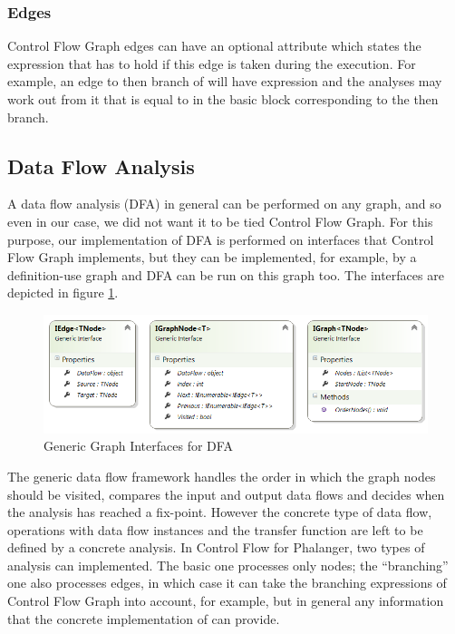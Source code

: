         \subsubsection*{Edges}
        Control Flow Graph edges can have an optional attribute which 
        states the expression that has to hold if this edge is taken 
        during the execution. For example, an edge to then branch of 
         will have expression  and the 
        analyses may work out from it that  is equal to 
         in the basic block corresponding to the then branch.
        
    \subsection{Data Flow Analysis}
        A data flow analysis (DFA) in general can be performed on any graph, 
        and so even in our case, we did not want it to be tied 
        Control Flow Graph. For this purpose, our implementation of DFA is 
        performed on interfaces that Control Flow Graph implements, 
        but they can be implemented, for example, by a definition-use 
        graph\cite{aho1985compilers} and DFA can be run on this graph too.
        The interfaces are depicted in figure \ref{graphifaces}.
        
\begin{figure}[h]  
  \centering
    \includegraphics*[width=\textwidth,height=\textheight,keepaspectratio]{img/graph-ifaces.png}  
    \caption{Generic Graph Interfaces for DFA\label{graphifaces}}
\end{figure}    

        The generic data flow framework handles the order in which the 
        graph nodes should be visited, compares the input and output 
        data flows and decides when the analysis has reached a fix-point. 
        However the concrete type of data flow, operations with data 
        flow instances and the transfer function are left to be defined 
        by a concrete analysis. In Control Flow for 
        Phalanger, two types of analysis can implemented. The basic one 
        processes only nodes; the ``branching'' one also processes edges, 
        in which case it can take the branching expressions of Control 
        Flow Graph into account, for example, but in general any information 
        that the concrete implementation of  can provide.
        
